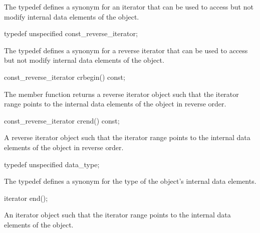 \begin{addedblock}
\begin{itemdescr}
The typedef defines a synonym for an iterator that can be used to access but not modify internal data elements of the  object.
\end{itemdescr}

\begin{itemdecl}
typedef unspecified const_reverse_iterator;
\end{itemdecl}

\begin{itemdescr}
The typedef defines a synonym for a reverse iterator that can be used to access but not modify internal data elements of the  object.
\end{itemdescr}

\begin{itemdecl}
const_reverse_iterator crbegin() const;
\end{itemdecl}

\begin{itemdescr}
\returns The member function returns a reverse iterator object such that the iterator range \tcode{[crbegin(), crend())} points to the internal data elements of the  object in reverse order.
\end{itemdescr}

\begin{itemdecl}
const_reverse_iterator crend() const;
\end{itemdecl}

\begin{itemdescr}
\returns A reverse iterator object such that the iterator range \tcode{[crbegin(), crend())} points to the internal data elements of the  object in reverse order.
\end{itemdescr}

\begin{itemdecl}
typedef unspecified data_type;
\end{itemdecl}

\begin{itemdescr}
The typedef defines a synonym for the type of the  object's internal data elements.
\end{itemdescr}

\begin{itemdecl}
iterator end();
\end{itemdecl}

\begin{itemdescr}
\returns An iterator object such that the iterator range \tcode{[begin(), end())} points to the internal data elements of the  object.
\end{itemdescr}


\end{addedblock}

